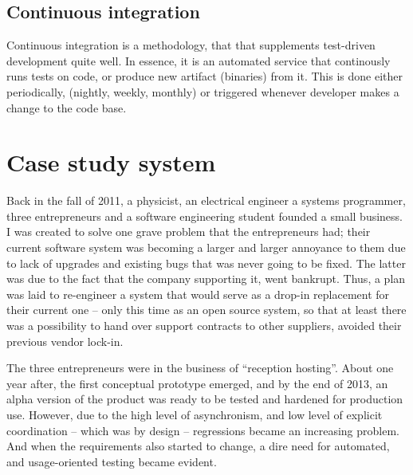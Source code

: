 \subsection{Continuous integration}
Continuous integration is a methodology, that that supplements test-driven development quite well. In essence, it is an automated service that continously runs tests on code, or produce new artifact (binaries) from it. This is done either periodically, (nightly, weekly, monthly) or triggered whenever developer makes a change to the code base.

\section{Case study system}
\label{sec:case-study-system}
Back in the fall of 2011, a physicist, an electrical engineer a systems programmer, three entrepreneurs and a software engineering student founded a small business. I was created to solve one grave problem that the entrepreneurs had; their current software system was becoming a larger and larger annoyance to them due to lack of upgrades and existing bugs that was never going to be fixed. The latter was due to the fact that the company supporting it, went bankrupt. Thus, a plan was laid to re-engineer a system that would serve as a drop-in replacement for their current one -- only this time as an open source system, so that at least there was a possibility to hand over support contracts to other suppliers, avoided their previous vendor lock-in.\medskip

\noindent The three entrepreneurs were in the business of ``reception hosting''. About one year after, the first conceptual prototype emerged, and by the end of 2013, an alpha version of the product was ready to be tested and hardened for production use. However, due to the high level of asynchronism, and low level of explicit coordination -- which was by design -- regressions became an increasing problem. And when the requirements also started to change, a dire need for automated, and usage-oriented testing became evident.

